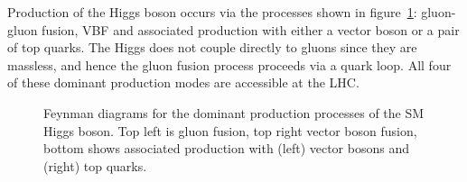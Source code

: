 Production of the Higgs boson occurs via the processes shown in
figure~\ref{fig:SMFeynmanDiagrams}: gluon-gluon fusion, \ac{VBF} and associated
production with either a vector boson or a pair of top quarks. The Higgs does
not couple directly to gluons since they are massless, and hence the gluon
fusion process proceeds via a quark loop. All four of these dominant production modes are
accessible at the LHC. 

\begin{figure}[htbp]

\caption[Feynman diagrams for the dominant production processes of the SM Higgs
boson.]{Feynman diagrams for the dominant production processes of the SM Higgs
boson. Top left is gluon fusion, top right vector boson fusion, bottom shows
associated production with (left) vector bosons and (right) top quarks.}
\label{fig:SMFeynmanDiagrams}
\end{figure}

